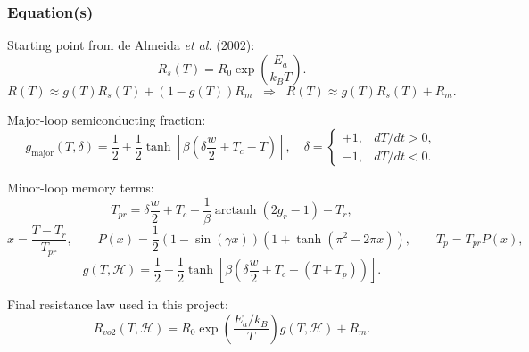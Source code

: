 \documentclass[11pt]{article}
\begin{document}
\subsubsection*{Equation(s)}
Starting point from de Almeida \emph{et al.} (2002):
\begin{equation}
R_s(T)=R_0\exp\!\left(\frac{E_a}{k_B T}\right).
\label{eq:intro_res_rs}
\end{equation}
\begin{equation}
R(T)\approx g(T)R_s(T)+(1-g(T))R_m
\;\;\Rightarrow\;\;
R(T)\approx g(T)R_s(T)+R_m.
\label{eq:intro_res_mix}
\end{equation}

Major-loop semiconducting fraction:
\begin{equation}
g_{\mathrm{major}}(T,\delta)=\frac{1}{2}+\frac{1}{2}\tanh\!\left[\beta\left(\delta\frac{w}{2}+T_c-T\right)\right],
\quad
\delta=\begin{cases}
+1,& dT/dt>0,\\
-1,& dT/dt<0.
\end{cases}
\label{eq:intro_res_major}
\end{equation}

Minor-loop memory terms:
\begin{equation}
T_{pr}=\delta\frac{w}{2}+T_c-\frac{1}{\beta}\operatorname{arctanh}(2g_r-1)-T_r,
\label{eq:intro_res_tpr}
\end{equation}
\begin{equation}
x=\frac{T-T_r}{T_{pr}},
\qquad
P(x)=\frac{1}{2}\left(1-\sin(\gamma x)\right)\left(1+\tanh(\pi^2-2\pi x)\right),
\qquad
T_p=T_{pr}P(x),
\label{eq:intro_res_proximity}
\end{equation}
\begin{equation}
g(T,\mathcal{H})=\frac{1}{2}+\frac{1}{2}\tanh\!\left[\beta\left(\delta\frac{w}{2}+T_c-(T+T_p)\right)\right].
\label{eq:intro_res_minor}
\end{equation}

Final resistance law used in this project:
\begin{equation}
R_{vo2}(T,\mathcal{H})=R_0\exp\!\left(\frac{E_a/k_B}{T}\right)g(T,\mathcal{H})+R_m.
\label{eq:intro_res_final}
\end{equation}
\end{document}
